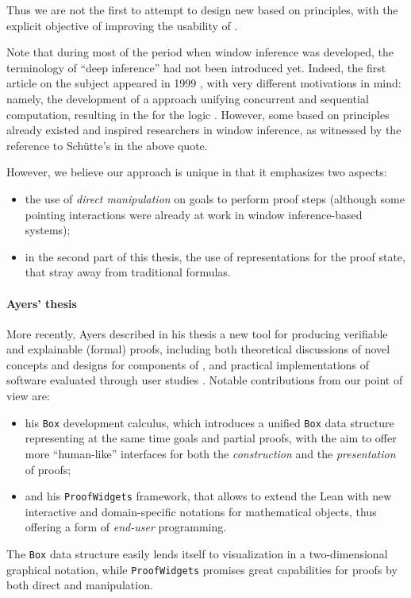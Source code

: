 Thus we are not the first to attempt to design new  based on  principles, with the explicit objective of improving the usability of
.
\begin{digression}
  Note that during most of the period when window inference was developed, the
terminology of ``deep inference'' had not been introduced yet. Indeed, the first
article on the subject appeared in 1999 \cite{Guglielmi1999ACO}, with very
different motivations in mind: namely, the development of a 
approach unifying concurrent and sequential computation, resulting in the
 for the logic . However, some  based
on  principles already existed and inspired researchers in window
inference, as witnessed by the reference to Schütte's  in the above
quote.
\end{digression}
However, we believe our approach is unique in that it emphasizes two aspects:
\begin{itemize}
  \item the use of \emph{direct manipulation} on goals to perform proof steps
  (although some pointing interactions were already at work in window
  inference-based systems);
  \item in the second part of this thesis, the use of \emph{}
  representations for the proof state, that stray away from traditional 
  formulas.
\end{itemize}

\paragraph{Ayers' thesis}

More recently, Ayers described in his thesis a new tool for producing verifiable
and explainable (formal) proofs, including both theoretical discussions of novel
concepts and designs for components of , and practical
implementations of software evaluated through user studies
. Notable contributions from our point of view are:
\begin{itemize}
  \item his \texttt{Box} development calculus, which introduces a unified
\texttt{Box} data structure representing at the same time goals and partial
proofs, with the aim to offer more ``human-like'' interfaces for both the
\emph{construction} and the \emph{presentation} of proofs;
  \item and his \texttt{ProofWidgets} framework, that allows to extend the Lean
 with new interactive and domain-specific notations for
mathematical objects, thus offering a form of \emph{end-user} programming.
\end{itemize}
The \texttt{Box} data structure easily lends itself to visualization in a
two-dimensional graphical notation, while \texttt{ProofWidgets} promises great
capabilities for proofs by both direct and  manipulation.

